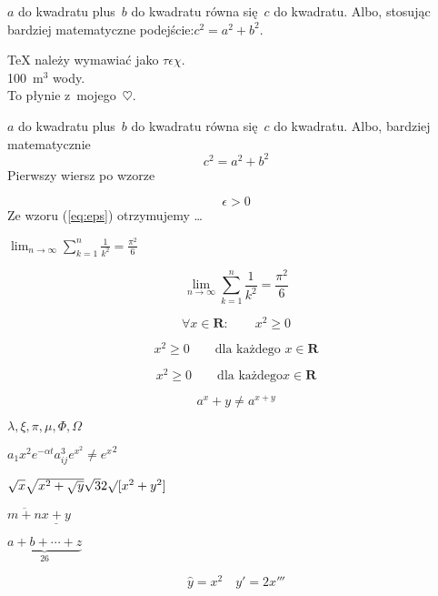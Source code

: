 \documentclass[10pt,a4paper]{article}
\begin{document}
$a$ do kwadratu plus~$b$ do kwadratu równa się~$c$ do kwadratu. 
Albo, stosując bardziej matematyczne podejście:$c^{2}=a^{2}+b^{2}$.

{\TeX} należy wymawiać jako $\tau\epsilon\chi$. \\[6pt]
100~m$^{3}$ wody. \\[6pt]
To płynie z~mojego~$\heartsuit$.

$a$ do kwadratu plus~$b$
do kwadratu równa się~$c$
do kwadratu. Albo, bardziej matematycznie 
\begin{displaymath}
c^{2}=a^{2}+b^{2}
\end{displaymath}
Pierwszy wiersz po wzorze

\begin{equation}
\epsilon > 0 \label{eq:eps}
\end{equation}
Ze wzoru (\ref{eq:eps})
otrzymujemy \ldots

$\lim_{n \to \infty}
\sum_{k=1}^n \frac{1}{k^2}
= \frac{\pi^2}{6}$

\begin{displaymath}
\lim_{n \to \infty}
\sum_{k=1}^n \frac{1}{k^2}
= \frac{\pi^2}{6}
\end{displaymath}

\begin{equation}
\forall x \in \mathbf{R}\colon
\qquad x^{2} \geq 0
\end{equation}

\begin{equation}
x^{2} \geq 0\qquad
\textrm{dla każdego }x\in\mathbf{R}
\end{equation}

\begin{displaymath}
x^{2} \geq 0\qquad
\textrm{dla każdego}x\in\mathbf{R}
\end{displaymath}

\begin{equation}
a^x+y \neq a^{x+y}
\end{equation}

$\lambda,\xi,\pi,\mu,\Phi,\Omega$

$a_{1} x^{2} e^{-\alpha t}
a^{3}_{ij} e^{x^2} \neq {e^x}^2$

$\sqrt{x} \sqrt{ x^{2}+\sqrt{y}}
\sqrt{3}{2} \surd[x^2 +y^2]$

$\overline{m+n} \underline{x+y}$

$\underbrace{ a+b+\cdots+z }_{26}$

\begin{displaymath}
\hat y=x^{2}\quad y'=2x'''
\end{displaymath}
\end{document}
